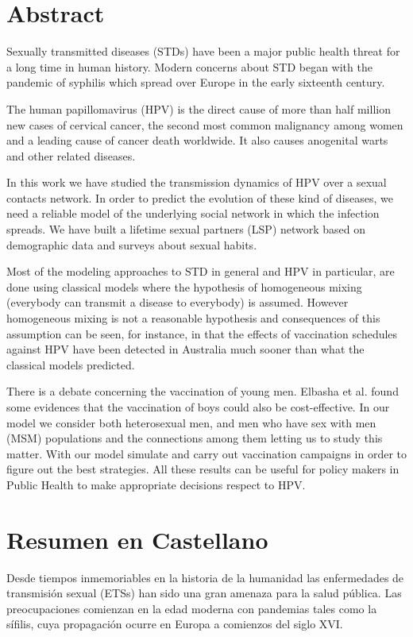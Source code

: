 
\chapter*{Abstract}
Sexually transmitted diseases (STDs) have been a major public health threat for a long time in human history. Modern concerns about STD began with the pandemic of syphilis which spread over Europe in the early sixteenth century. 

The human papillomavirus (HPV) is the direct cause of more than half million new cases of cervical cancer, the second most common malignancy among women and a leading cause of cancer death worldwide. It also causes anogenital warts and other related diseases.

In this work we have studied the transmission dynamics of HPV over a sexual contacts network. In order to predict the evolution of these kind of diseases, we need a reliable model of the underlying social network in which the infection spreads. We have built a lifetime sexual partners (LSP) network based on demographic data and surveys about sexual habits.

Most of the modeling approaches to STD in general and HPV in particular, are done using classical models where the hypothesis of homogeneous mixing (everybody can transmit a disease to everybody) is assumed. However homogeneous mixing is not a reasonable hypothesis and consequences of this assumption can be seen, for instance, in that the effects of vaccination schedules against HPV have been detected in Australia much sooner than what the classical models predicted. %

There is a debate concerning the vaccination of young men. Elbasha et al. found some evidences that the vaccination of boys could also be cost-effective. In our model we consider both heterosexual men, and men who have sex with men (MSM) populations and the connections among them letting us to study this matter. With our model simulate and carry out vaccination campaigns in order to figure out the best strategies. All these results can be useful for policy makers in Public Health to make appropriate decisions respect to HPV.

\chapter*{Resumen en Castellano}
Desde tiempos inmemoriables en la historia de la humanidad las enfermedades de transmisi\'on sexual (ETSs) han sido una gran amenaza para la salud p\'ublica. Las preocupaciones comienzan en la edad moderna con pandemias tales como la s\'ifilis, cuya propagaci\'on ocurre en Europa a comienzos del siglo XVI.

